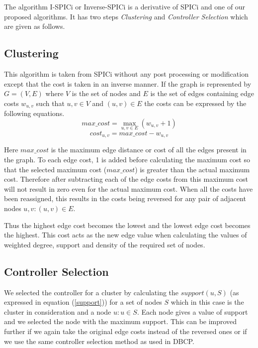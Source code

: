 \documentclass[10pt]{extarticle}
\begin{document}
	The algorithm I-SPICi or Inverse-SPICi is a derivative of SPICi and one of our proposed algorithms. It has two steps \emph{Clustering} and \emph{Controller Selection} which are given as follows.
	
	\subsection{Clustering}
	This algorithm is taken from SPICi without any post processing or modification except that the cost is taken in an inverse manner. If the graph is represented by $G=(V,E)$ where $V$ is the set of nodes and $E$ is the set of edges containing edge costs $w_{u,v}$ such that $u,v\in V$ and $(u,v)\in E$ the costs can be expressed by the following equations.
	\begin{equation}
	max\_cost = \max_{u,v\in E}(w_{u,v}+1)
	\end{equation}
	\begin{equation}
	cost_{u,v} = max\_cost - w_{u,v}
	\end{equation}
	
	Here $max\_cost$ is the maximum edge distance or cost of all the edges present in the graph. To each edge cost, 1 is added before calculating the maximum cost so that the selected maximum cost ($max\_cost$) is greater than the actual maximum cost. Therefore after subtracting each of the edge costs from this maximum cost will not result in zero even for the actual maximum cost. When all the costs have been reassigned, this results in the costs being reversed for any pair of adjacent nodes $u,v:(u,v)\in E$. 
	
	Thus the highest edge cost becomes the lowest and the lowest edge cost becomes the highest.
	This cost acts as the new edge value when calculating the values of weighted degree, support and density of the required set of nodes.
	
	\subsection{Controller Selection}
	We selected the controller for a cluster by calculating the $support(u,S)$ (as expressed in equation (\ref{support})) for a set of nodes $S$ which in this case is the cluster in consideration and a node $u:u\in S$. Each node gives a value of support and we selected the node with the maximum support. This can be improved further if we again take the original edge costs instead of the reversed ones or if we use the same controller selection method as used in DBCP.
	
\end{document}
